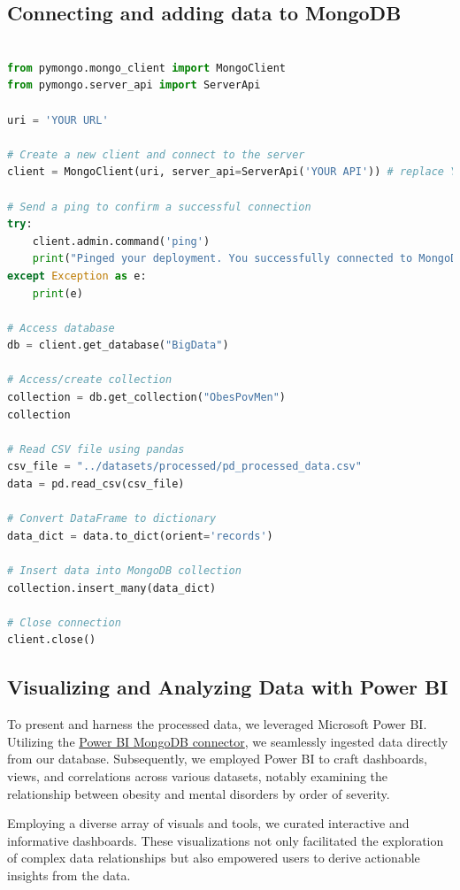 \documentclass[runningheads]{llncs}
\begin{document}
\subsection{Connecting and adding data to MongoDB}

\begin{lstlisting}[language=Python,caption={Pymongo workflow},label={lst:example}]

from pymongo.mongo_client import MongoClient
from pymongo.server_api import ServerApi

uri = 'YOUR URL'

# Create a new client and connect to the server
client = MongoClient(uri, server_api=ServerApi('YOUR API')) # replace YOUR API with your MongoDB API

# Send a ping to confirm a successful connection
try:
    client.admin.command('ping')
    print("Pinged your deployment. You successfully connected to MongoDB!")
except Exception as e:
    print(e)

# Access database
db = client.get_database("BigData")

# Access/create collection
collection = db.get_collection("ObesPovMen")
collection

# Read CSV file using pandas
csv_file = "../datasets/processed/pd_processed_data.csv"
data = pd.read_csv(csv_file)

# Convert DataFrame to dictionary
data_dict = data.to_dict(orient='records')

# Insert data into MongoDB collection
collection.insert_many(data_dict)

# Close connection
client.close()
\end{lstlisting}

\subsection{Visualizing and Analyzing Data with Power BI}

To present and harness the processed data, we leveraged Microsoft Power BI. Utilizing the \href{https://www.mongodb.com/docs/atlas/data-federation/query/sql/powerbi/connect/}{Power BI MongoDB connector}, we seamlessly ingested data directly from our database. Subsequently, we employed Power BI to craft dashboards, views, and correlations across various datasets, notably examining the relationship between obesity and mental disorders by order of severity.

Employing a diverse array of visuals and tools, we curated interactive and informative dashboards. These visualizations not only facilitated the exploration of complex data relationships but also empowered users to derive actionable insights from the data.
\end{document}
